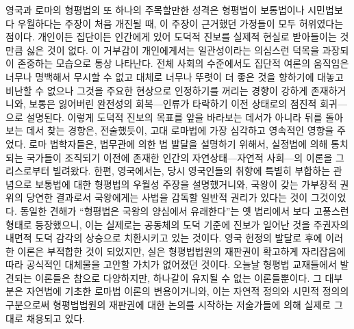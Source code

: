 영국과 로마의 형평법의 또 하나의 주목할만한 성격은
형평법이 보통법이나 시민법보다 우월하다는 주장이 처음
개진될 때, 이 주장이 근거했던 가정들이 모두 허위였다는 점이다.
개인이든 집단이든 인간에게 있어 도덕적 진보를 실제적 현실로
받아들이는 것만큼 싫은 것이 없다.
이 거부감이 개인에게서는 일관성이라는 의심스런 덕목을 과장되이 존중하는
모습으로 통상 나타난다.
전체 사회의 수준에서도 집단적 여론의 움직임은 너무나 명백해서 무시할 수 없고
대체로 너무나 뚜렷이 더 좋은 것을 향하기에 대놓고 비난할 수 없으나
그것을 주요한 현상으로 인정하기를 꺼리는 경향이 강하게 존재하거니와,
보통은 잃어버린 완전성의 회복---인류가 타락하기 이전 상태로의 점진적
회귀---으로 설명된다.
이렇게 도덕적 진보의 목표를 앞을 바라보는 데서가 아니라
뒤를 돌아보는 데서 찾는 경향은, 전술했듯이,
고대 로마법에 가장 심각하고 영속적인 영향을 주었다.
로마 법학자들은, 법무관에 의한 법 발달을 설명하기 위해서,
실정법에 의해 통치되는 국가들이 조직되기 이전에 존재한
인간의 자연상태---자연적 사회---의 이론을 그리스로부터 빌려왔다.
한편, 영국에서는, 당시 영국인들의 취향에 특별히 부합하는 관념으로
보통법에 대한 형평법의 우월성 주장을 설명했거니와,
국왕이 갖는 가부장적 권위의 당연한 결과로서 국왕에게는
사법을 감독할 일반적 권리가 있다는 것이 그것이었다.
동일한 견해가
``형평법은 국왕의 양심에서 유래한다''는
옛 법리에서
보다 고풍스런 형태로
등장했으니, 이는
실제로는 공동체의 도덕 기준에 진보가 일어난 것을
주권자의 내면적 도덕 감각의 상승으로 치환시키고 있는 것이다.
영국 헌정의 발달로 후에 이러한 이론은 부적합한 것이 되었지만,
실은 형평법법원의 재판권이 확고하게 자리잡음에 따라 공식적인 대체물을
고안할 가치가 없어졌던 것이다.
오늘날 형평법 교재들에서 발견되는 이론들은 참으로 다양하지만,
하나같이 유지될 수 없는 이론들뿐이다.
그 대부분은 자연법에 기초한 로마법 이론의 변용이거니와,
이는
자연적 정의와 시민적 정의의 구분으로써
형평법법원의 재판권에 대한 논의를 시작하는
저술가들에 의해
실제로 그대로
채용되고 있다.

